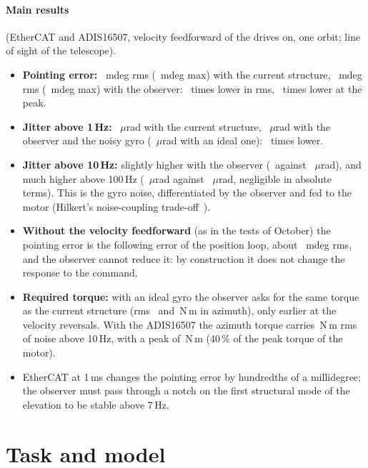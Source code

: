 \documentclass[10pt,a4paper]{article}
\numberwithin{equation}{section}
\begin{document}
\paragraph{Main results} (EtherCAT and ADIS16507, velocity feedforward of the drives on, one orbit; line of sight of the telescope).
\begin{itemize}
\item \textbf{Pointing error:} \ErmsCur\ mdeg rms (\EmaxCur\ mdeg max) with the current structure, \ErmsDob\ mdeg rms (\EmaxDob\ mdeg max) with the observer: \EratioRms\ times lower in rms, \EratioMax\ times lower at the peak.
\item \textbf{Jitter above 1\,Hz:} \JoneCur\ $\mu$rad with the current structure, \JoneDob\ $\mu$rad with the observer and the noisy gyro (\JoneIdeal\ $\mu$rad with an ideal one): \JoneRatio\ times lower.
\item \textbf{Jitter above 10\,Hz:} slightly higher with the observer (\JtenDob\ against \JtenCur\ $\mu$rad), and much higher above 100\,Hz (\JhunDob\ $\mu$rad against \JhunCur\ $\mu$rad, negligible in absolute terms). This is the gyro noise, differentiated by the observer and fed to the motor (Hilkert's noise-coupling trade-off~\cite[eq.~9]{hilkert2011}).
\item \textbf{Without the velocity feedforward} (as in the tests of October) the pointing error is the following error of the position loop, about \ErmsNoFFCur\ mdeg rms, and the observer cannot reduce it: by construction it does not change the response to the command.
\item \textbf{Required torque:} with an ideal gyro the observer asks for the same torque as the current structure (rms \tauRmsCurAz\ and \tauRmsIdealAz\,N\,m in azimuth), only earlier at the velocity reversals. With the ADIS16507 the azimuth torque carries \tauHiDobAz\,N\,m rms of noise above 10\,Hz, with a peak of \tauPkDobAz\,N\,m (40\,\% of the peak torque of the motor).
\item EtherCAT at 1\,ms changes the pointing error by hundredths of a millidegree; the observer must pass through a notch on the first structural mode of the elevation to be stable above 7\,Hz.
\end{itemize}

\tableofcontents

\section{Task and model}\label{sec:task}
\end{document}
